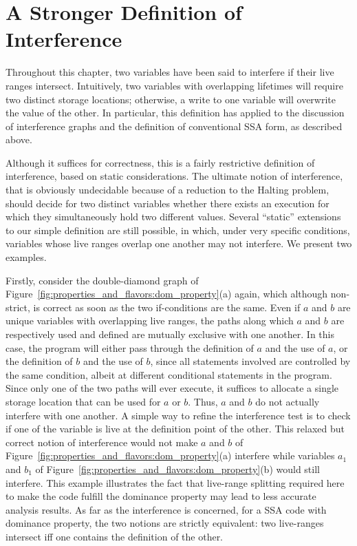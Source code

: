 \section{A Stronger Definition of Interference}
\label{sec:properties_and_flavors:ultimate_interference}
Throughout this chapter, two variables have been said to interfere
if their live ranges intersect. Intuitively, two variables with overlapping
lifetimes will require two distinct storage locations; otherwise, a write
to one variable will overwrite the value of the other. In particular,
this definition has applied to the discussion of interference graphs
and the definition of conventional SSA form, as described above.

Although it suffices
for correctness, this is a fairly restrictive definition of interference, based on static considerations. 
The ultimate notion of interference, that is obviously undecidable because of a reduction to the Halting problem, should decide for two distinct variables whether there exists an execution for which they simultaneously hold two different values. 
Several ``static'' extensions to our simple definition are still possible, in which,
under very specific conditions, variables whose live ranges overlap
one another may not interfere. 
We present two examples.

Firstly, consider the double-diamond graph of Figure~\ref{fig:properties_and_flavors:dom_property}(a) again, which although non-strict, is correct as soon as the two if-conditions are the same.
Even if $a$ and $b$ are unique variables with overlapping live
ranges, the paths along which $a$ and $b$ are respectively used and
defined are mutually exclusive with one another. In this case, the
program will either pass through the definition of $a$ and the use
of $a$, or the definition of $b$ and the use of $b$, since all
statements involved are controlled by the same condition, albeit
at different conditional statements in the program. Since only
one of the two paths will ever execute, it suffices to allocate a 
single storage location that can be used for $a$ or $b$. Thus, $a$
and $b$ do not actually interfere with one another. A simple way to refine the interference test is to 
check if one of the variable is live at the definition point of the other. 
This relaxed but correct notion of interference would not make $a$ and $b$ of Figure~\ref{fig:properties_and_flavors:dom_property}(a) interfere while variables $a_1$ and $b_1$ of Figure~\ref{fig:properties_and_flavors:dom_property}(b) would still interfere. This example illustrates the fact that live-range splitting required here to make the code fulfill the dominance property may lead to less accurate analysis results.
As far as the interference is concerned, for a SSA code with dominance property, the two notions are strictly equivalent: two live-ranges intersect iff one contains the definition of the other.  


